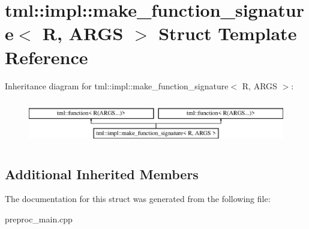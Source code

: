\hypertarget{structtml_1_1impl_1_1make__function__signature}{\section{tml\+:\+:impl\+:\+:make\+\_\+function\+\_\+signature$<$ R, A\+R\+G\+S $>$ Struct Template Reference}
\label{structtml_1_1impl_1_1make__function__signature}
}
Inheritance diagram for tml\+:\+:impl\+:\+:make\+\_\+function\+\_\+signature$<$ R, A\+R\+G\+S $>$\+:\begin{figure}[H]
\begin{center}
\leavevmode
\includegraphics[height=1.971831cm]{structtml_1_1impl_1_1make__function__signature}
\end{center}
\end{figure}
\subsection*{Additional Inherited Members}


The documentation for this struct was generated from the following file\+:\begin{DoxyCompactItemize}
\item 
preproc\+\_\+main.\+cpp\end{DoxyCompactItemize}
